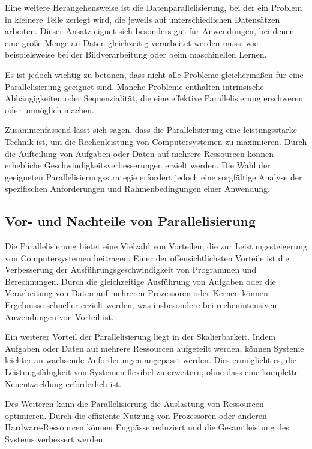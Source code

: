 Eine weitere Herangehensweise ist die Datenparallelisierung, bei der ein Problem in kleinere Teile zerlegt wird, die jeweils auf unterschiedlichen Datensätzen arbeiten. Dieser Ansatz eignet sich besonders gut für Anwendungen, bei denen eine große Menge an Daten gleichzeitig verarbeitet werden muss, wie beispielsweise bei der Bildverarbeitung oder beim maschinellen Lernen.

Es ist jedoch wichtig zu betonen, dass nicht alle Probleme gleichermaßen für eine Parallelisierung geeignet sind. Manche Probleme enthalten intrinsische Abhängigkeiten oder Sequenzialität, die eine effektive Parallelisierung erschweren oder unmöglich machen.

Zusammenfassend lässt sich sagen, dass die Parallelisierung eine leistungsstarke Technik ist, um die Rechenleistung von Computersystemen zu maximieren. Durch die Aufteilung von Aufgaben oder Daten auf mehrere Ressourcen können erhebliche Geschwindigkeitsverbesserungen erzielt werden. Die Wahl der geeigneten Parallelisierungsstrategie erfordert jedoch eine sorgfältige Analyse der spezifischen Anforderungen und Rahmenbedingungen einer Anwendung.

\subsection{Vor- und Nachteile von Parallelisierung}
\label{sec:Grundlagen_Parallelisierung_Vorteile_Nachteile}
Die Parallelisierung bietet eine Vielzahl von Vorteilen, die zur Leistungssteigerung von Computersystemen beitragen. Einer der offensichtlichsten Vorteile ist die Verbesserung der Ausführungsgeschwindigkeit von Programmen und Berechnungen. Durch die gleichzeitige Ausführung von Aufgaben oder die Verarbeitung von Daten auf mehreren Prozessoren oder Kernen können Ergebnisse schneller erzielt werden, was insbesondere bei rechenintensiven Anwendungen von Vorteil ist.

Ein weiterer Vorteil der Parallelisierung liegt in der Skalierbarkeit. Indem Aufgaben oder Daten auf mehrere Ressourcen aufgeteilt werden, können Systeme leichter an wachsende Anforderungen angepasst werden. Dies ermöglicht es, die Leistungsfähigkeit von Systemen flexibel zu erweitern, ohne dass eine komplette Neuentwicklung erforderlich ist.

Des Weiteren kann die Parallelisierung die Auslastung von Ressourcen optimieren. Durch die effiziente Nutzung von Prozessoren oder anderen Hardware-Ressourcen können Engpässe reduziert und die Gesamtleistung des Systems verbessert werden.

